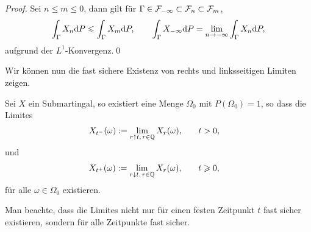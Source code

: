 \begin{proof}
Sei $n\le m\le 0$, dann gilt für $\Gamma\in \mathcal{F}_{-\infty}\subset \mathcal{F}_n\subset
\mathcal{F}_m$,
\begin{align*}
\int_\Gamma X_n\mathrm{d} P \leqslant \int_\Gamma X_m\mathrm{d} P,\qquad \int_\Gamma X_{-\infty} \mathrm{d} P = 
\lim\limits_{n\to -\infty} \int_\Gamma X_n\mathrm{d} P,
\end{align*}
aufgrund der $L^1$-Konvergenz.\qed
\end{proof}


Wir können nun die fast sichere Existenz von rechts und linksseitigen Limiten
zeigen.

\begin{prop}
\label{prop:1.9}
Sei $X$ ein Submartingal, so existiert eine Menge $\Omega_0$ mit $P(\Omega_0) =
1$, so dass die Limites
\begin{align*}
X_{t^-}(\omega):= \lim_{r\uparrow t,\, r\in\mathbb{Q}} X_r(\omega),\qquad & t > 0,
\end{align*}
und 
\begin{align*}
X_{t^+}(\omega):= \lim_{r\downarrow t,\, r\in\mathbb{Q}} X_r(\omega),\qquad & t \geqslant
0,
\end{align*}
für alle $\omega\in\Omega_0$ existieren.\fish
\end{prop}

Man beachte, dass die Limites nicht nur für einen festen Zeitpunkt $t$ fast
sicher existieren, sondern  für alle Zeitpunkte fast sicher.

